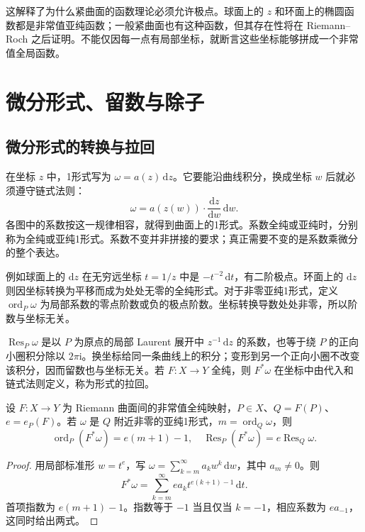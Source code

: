 这解释了为什么紧曲面的函数理论必须允许极点。球面上的 \(z\) 和环面上的椭圆函数都是非常值亚纯函数；一般紧曲面也有这种函数，但其存在性将在 Riemann--Roch 之后证明。不能仅因每一点有局部坐标，就断言这些坐标能够拼成一个非常值全局函数。

\section{微分形式、留数与除子}
\label{b3:sec:A02}

\subsection{微分形式的转换与拉回}
\label{b3:subsec:A0201}

在坐标 \(z\) 中，1形式写为 \(\omega=a(z)\,\mathrm{d}z\)。它要能沿曲线积分，换成坐标 \(w\) 后就必须遵守链式法则：
\[
 \omega=a(z(w))\cdot\frac{\mathrm{d}z}{\mathrm{d}w}\,\mathrm{d}w.
\]
各图中的系数按这一规律相容，就得到曲面上的1形式。系数全纯或亚纯时，分别称为全纯或亚纯1形式。系数不变并非拼接的要求；真正需要不变的是系数乘微分的整个表达。

\ProseParagraphBreak
例如球面上的 \(\mathrm{d}z\) 在无穷远坐标 \(t=1/z\) 中是 \(-t^{-2}\,\mathrm{d}t\)，有二阶极点。环面上的 \(\mathrm{d}z\) 则因坐标转换为平移而成为处处无零的全纯形式。对于非零亚纯1形式，定义 \(\operatorname{ord}_P\omega\) 为局部系数的零点阶数或负的极点阶数。坐标转换导数处处非零，所以阶数与坐标无关。

\ProseParagraphBreak
\(\operatorname{Res}_P\omega\) 是以 \(P\) 为原点的局部 Laurent 展开中 \(z^{-1}\,\mathrm{d}z\) 的系数，也等于绕 \(P\) 的正向小圈积分除以 \(2\pi\mathrm{i}\)。换坐标给同一条曲线上的积分；变形到另一个正向小圈不改变该积分，因而留数也与坐标无关。若 \(F:X\rightarrow Y\) 全纯，则 \(F^*\omega\) 在坐标中由代入和链式法则定义，称为形式的拉回。

\begin{proposition}[拉回的阶数与留数]\label{b3:prop:A-pullback-differential}
设 \(F:X\rightarrow Y\) 为 Riemann 曲面间的非常值全纯映射，\(P\in X\)、\(Q=F(P)\)、\(e=e_P(F)\)。若 \(\omega\) 是 \(Q\) 附近非零的亚纯1形式，\(m=\operatorname{ord}_Q\omega\)，则
\[
 \operatorname{ord}_P(F^*\omega)=e(m+1)-1,
 \quad
 \operatorname{Res}_P(F^*\omega)=e\operatorname{Res}_Q\omega.
\]
\end{proposition}
\begin{proof}
用局部标准形 \(w=t^e\)，写 \(\omega=\sum_{k=m}^{\infty}a_k w^k\,\mathrm{d}w\)，其中 \(a_m\ne0\)。则
\[
 F^*\omega=\sum_{k=m}^{\infty}e a_k t^{e(k+1)-1}\,\mathrm{d}t.
\]
首项指数为 \(e(m+1)-1\)。指数等于 \(-1\) 当且仅当 \(k=-1\)，相应系数为 \(e a_{-1}\)，这同时给出两式。
\end{proof}

